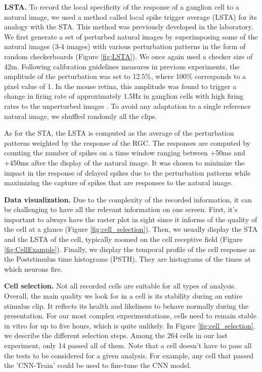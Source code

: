 
\textbf{LSTA.}
To record the local specificity of the response of a ganglion cell to a natural
image, we used a method called local spike trigger average (LSTA) for its
analogy with the STA. This method was previously developed in the laboratory.
We first generate a set of perturbed natural images by superimposing some of
the natural images (3-4 images) with various perturbation patterns in the form
of random checkerboards (Figure \ref{fig:LSTA}). We once again used a checker
size of 42\textmu m.
Following calibration guidelines measures in previous experiments, the
amplitude of the perturbation was set to 12.5\%, where 100\% corresponds to a
pixel value of 1. In the mouse retina, this amplitude was found to trigger a
change in firing rate of approximately 1.5Hz in ganglion cells with high firing
rates to the unperturbed images \citep{goldin_context-dependent_2022}. To avoid
any adaptation to a single reference natural image, we shuffled randomly all
the clips.

As for the STA, the LSTA is computed as the average of the perturbation
patterns weighted by the response of the RGC. The responses are computed by
counting the number of spikes on a time window ranging between +50ms and +450ms
after the display of the natural image. It was chosen to minimize the impact in
the response of delayed spikes due to the perturbation patterns while
maximizing
the capture of spikes that are responses to the natural image.

\textbf{Data visualization.}
Due to the complexity of the recorded information, it can be challenging to
have
all the relevant information on one screen. First, it's important to always
have the raster plot in sight since it informs of the quality of the cell at a
glance (Figure \ref{fig:cell_selection}).
Then, we usually display the STA and the LSTA of the cell, typically zoomed on
the cell receptive field (Figure \ref{fig:CellExample}).
Finally, we display the temporal profile of the cell response as the
Poststimulus time histograms
(PSTH). They are histograms of the times at which neurons fire.



\textbf{Cell selection.}
Not all recorded cells are suitable for all types of analysis. Overall, the
main quality we look for in a cell is its stability during an entire stimulus
clip.
It reflects its health and likeliness to behave normally during the
presentation. For our most complex experimentations, cells need to remain
stable in vitro for up to five hours, which is quite unlikely. In Figure
\ref{fig:cell_selection}, we
describe the different selection steps. Among the 264 cells
in our last experiment, only 14 passed all of them. Note that a cell doesn't
have to
pass all the tests to be considered for a given analysis. For example, any cell
that passed the 'CNN-Train' could be used to fine-tune the CNN model.

